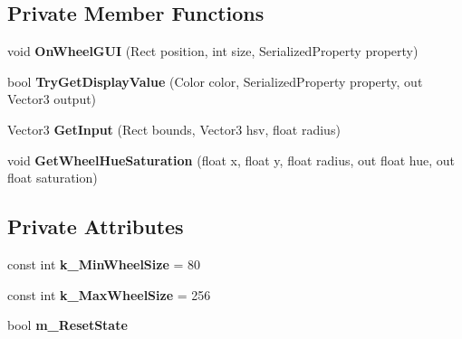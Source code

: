 \subsection*{Private Member Functions}
\begin{DoxyCompactItemize}
\item 
\mbox{\label{class_unity_editor_1_1_post_processing_1_1_trackball_group_drawer_a9912c3c510cc003d5127337f7b9c2c62}} 
void {\bfseries On\+Wheel\+G\+UI} (Rect position, int size, Serialized\+Property property)
\item 
\mbox{\label{class_unity_editor_1_1_post_processing_1_1_trackball_group_drawer_a8ec5f5222e287f336547772a53277d60}} 
bool {\bfseries Try\+Get\+Display\+Value} (Color color, Serialized\+Property property, out Vector3 output)
\item 
\mbox{\label{class_unity_editor_1_1_post_processing_1_1_trackball_group_drawer_ac8b29b2cb2e57601ad050c66374649bd}} 
Vector3 {\bfseries Get\+Input} (Rect bounds, Vector3 hsv, float radius)
\item 
\mbox{\label{class_unity_editor_1_1_post_processing_1_1_trackball_group_drawer_a9781cb117e7c7bd3355469193b24d0e2}} 
void {\bfseries Get\+Wheel\+Hue\+Saturation} (float x, float y, float radius, out float hue, out float saturation)
\end{DoxyCompactItemize}
\subsection*{Private Attributes}
\begin{DoxyCompactItemize}
\item 
\mbox{\label{class_unity_editor_1_1_post_processing_1_1_trackball_group_drawer_a43cd4dd298a8bb194ff1f7378efeb351}} 
const int {\bfseries k\+\_\+\+Min\+Wheel\+Size} = 80
\item 
\mbox{\label{class_unity_editor_1_1_post_processing_1_1_trackball_group_drawer_ab960c90013932b21507e57aa9620a822}} 
const int {\bfseries k\+\_\+\+Max\+Wheel\+Size} = 256
\item 
\mbox{\label{class_unity_editor_1_1_post_processing_1_1_trackball_group_drawer_ac85e1ba72a09597c85774fe6c48c9fe3}} 
bool {\bfseries m\+\_\+\+Reset\+State}
\end{DoxyCompactItemize}
